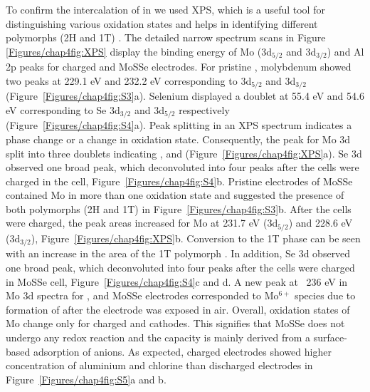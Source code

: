 To confirm the intercalation of  in  we used XPS, which is a useful tool for distinguishing various oxidation states and helps in identifying different polymorphs (2H and 1T) \cite{fan_hybrid_2017}. The detailed narrow spectrum scans in Figure \ref{Figures/chap4fig:XPS} display the binding energy of Mo (3d$_{5/2}$ and 3d$_{3/2}$) and Al 2p peaks for charged  and MoSSe electrodes. For pristine , molybdenum showed two peaks at 229.1 eV and 232.2 eV corresponding to 3d$_{5/2}$ and 3d$_{3/2}$ (Figure\ \ref{Figures/chap4fig:S3}a). Selenium displayed a doublet at 55.4 eV and 54.6 eV corresponding to Se 3d$_{3/2}$ and 3d$_{5/2}$ respectively (Figure\ \ref{Figures/chap4fig:S4}a). Peak splitting in an XPS spectrum indicates a phase change or a change in oxidation state. Consequently, the peak for Mo 3d split into three doublets indicating ,  and  (Figure\ \ref{Figures/chap4fig:XPS}a). Se 3d observed one broad peak, which deconvoluted into four peaks after the cells were charged in the  cell, Figure\ \ref{Figures/chap4fig:S4}b. Pristine electrodes of MoSSe contained Mo in more than one oxidation state and suggested the presence of both polymorphs (2H and 1T) in Figure\ \ref{Figures/chap4fig:S3}b. After the cells were charged, the peak areas increased for Mo at 231.7 eV (3d$_{5/2}$) and 228.6 eV (3d$_{3/2}$), Figure\ \ref{Figures/chap4fig:XPS}b. Conversion to the 1T phase can be seen with an increase in the area of the 1T polymorph \cite{fan_hybrid_2017}. In addition, Se 3d observed one broad peak, which deconvoluted into four peaks after the cells were charged in MoSSe cell, Figure\ \ref{Figures/chap4fig:S4}c and d. A new peak at ~236 eV in Mo 3d spectra for ,  and MoSSe electrodes corresponded to Mo$^{6+}$ species due to formation of  after the electrode was exposed in air. Overall, oxidation states of Mo change only for charged  and  cathodes. This signifies that MoSSe does not undergo any redox reaction and the capacity is mainly derived from a surface-based adsorption of anions. As expected, charged electrodes showed higher concentration of aluminium and chlorine than discharged electrodes in Figure\ \ref{Figures/chap4fig:S5}a and b. 
